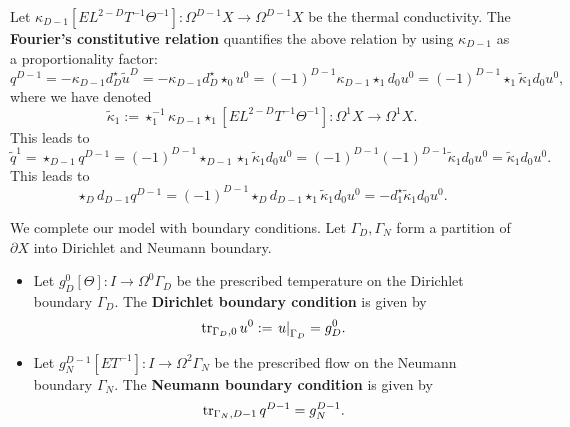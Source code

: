 \begin{discussion}
\begin{itemize}
      Let
      $\kappa_{D - 1} [E L^{2 - D} T^{-1} \Theta^{-1}]
      \colon \Omega^{D - 1} X \to \Omega^{D - 1} X$
      be the thermal conductivity.
      The \textbf{Fourier's constitutive relation}
      quantifies the above relation by using $\kappa_{D - 1}$
      as a proportionality factor:
      \begin{equation}
        q^{D - 1}
        = - \kappa_{D - 1} d_D^\star \tilde{u}^D
        = - \kappa_{D - 1} d_D^\star \star_0 u^0
        = (-1)^{D - 1} \kappa_{D - 1} \star_1 d_0 u^0
        = (-1)^{D - 1} \star_1 \tilde{\kappa}_1 d_0 u^0,
      \end{equation}
      where we have denoted
      \begin{equation}
        \tilde{\kappa}_1
        :=\star_1^{-1} \kappa_{D - 1} \star_1 [E L^{2 - D} T^{-1} \Theta^{-1}]
        \colon \Omega^1 X \to \Omega^1 X.
      \end{equation}
      This leads to
      \begin{equation}
        \tilde{q}^1 
        = \star_{D - 1} q^{D - 1}
        = (-1)^{D - 1} \star_{D - 1} \star_1 \tilde{\kappa}_1 d_0 u^0
        = (-1)^{D - 1} (-1)^{D - 1} \tilde{\kappa}_1 d_0 u^0
        = \tilde{\kappa}_1 d_0 u^0.
      \end{equation}
      This leads to
      \begin{equation}
        \star_D d_{D - 1} q^{D - 1}
        = (-1)^{D - 1} \star_D d_{D - 1} \star_1 \tilde{\kappa}_1 d_0 u^0
        = - d^\star_1 \tilde{\kappa}_1 d_0 u^0.
      \end{equation}
  \end{itemize}
  We complete our model with boundary conditions.
  Let $\Gamma_D, \Gamma_N$ form a partition of $\partial X$
  into Dirichlet and Neumann boundary.
  \begin{itemize}
    \item
      Let $g_D^0 [\Theta] \colon I \to \Omega^0 \Gamma_D$
      be the prescribed temperature on the Dirichlet boundary $\Gamma_D$.
      The \textbf{Dirichlet boundary condition} is given by
      \begin{equation}
        \mathop{\rm tr}\nolimits_{\Gamma_D, 0} u^0 := \left. u \right|_{\Gamma_D} = g_D^0.
      \end{equation}
    \item
      Let $g_N^{D - 1} [E T^{-1}] \colon I \to \Omega^2 \Gamma_N$
      be the prescribed flow on the Neumann boundary $\Gamma_N$.
      The \textbf{Neumann boundary condition} is given by
      \begin{equation}
        \mathop{\rm tr}\nolimits_{\Gamma_N, D - 1} q^{D - 1} = g_N^{D - 1}.
      \end{equation}
  \end{itemize}
\end{discussion}
